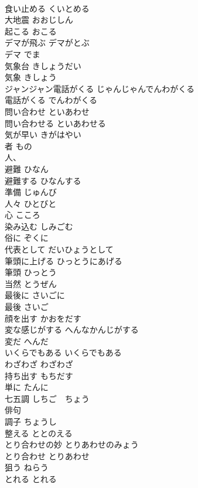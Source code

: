 \documentclass[8pt]{extreport}
\begin{document}
\begin{CJK}{UTF8}{min}
\\	食い止める	くいとめる	
\\	大地震	おおじしん	
\\	起こる	おこる	
\\	デマが飛ぶ	デマがとぶ	
\\	デマ	でま	
\\	気象台	きしょうだい	
\\	気象	きしょう	
\\	ジャンジャン電話がくる	じゃんじゃんでんわがくる	
\\	電話がくる	でんわがくる	
\\	問い合わせ	といあわせ	
\\	問い合わせる	といあわせる	
\\	気が早い	きがはやい	
\\	者	もの	
\\	人、
\\	避難	ひなん	
\\	避難する	ひなんする	
\\	準備	じゅんび	
\\	人々	ひとびと	
\\	心	こころ	
\\	染み込む	しみごむ	
\\	俗に	ぞくに	
\\	代表として	だいひょうとして	
\\	筆頭に上げる	ひっとうにあげる	
\\	筆頭	ひっとう	
\\	当然	とうぜん	
\\	最後に	さいごに	
\\	最後	さいご	
\\	顔を出す	かおをだす	
\\	変な感じがする	へんなかんじがする	
\\	変だ	へんだ	
\\	いくらでもある	いくらでもある	
\\	わざわざ	わざわざ	
\\	持ち出す	もちだす	
\\	単に	たんに	
\\	七五調	しちご　ちょう	
\\	俳句
\\	調子	ちょうし	
\\	整える	ととのえる	
\\	とり合わせの妙	とりあわせのみょう	
\\	とり合わせ	とりあわせ	
\\	狙う	ねらう	
\\	とれる	とれる	

\end{CJK}
\end{document}
